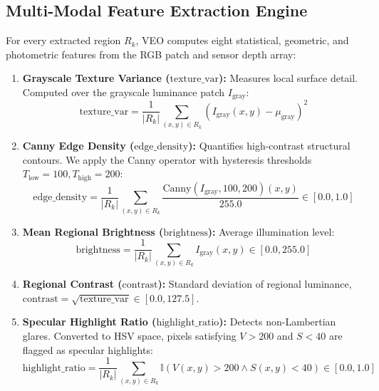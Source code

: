 \documentclass[11pt,a4paper]{article}
\begin{document}
\subsection{Multi-Modal Feature Extraction Engine}
\label{sec:features}
For every extracted region $R_k$, VEO computes eight statistical, geometric, and photometric features from the RGB patch and sensor depth array:

\begin{enumerate}
    \item \textbf{Grayscale Texture Variance ($\text{texture\_var}$):} Measures local surface detail. Computed over the grayscale luminance patch $I_{\mathrm{gray}}$:
    \begin{equation}
    \label{eq:feat_texture}
    \text{texture\_var} = \frac{1}{|R_k|} \sum_{(x,y) \in R_k} \left( I_{\mathrm{gray}}(x,y) - \mu_{\mathrm{gray}} \right)^2
    \end{equation}
    \item \textbf{Canny Edge Density ($\text{edge\_density}$):} Quantifies high-contrast structural contours. We apply the Canny operator with hysteresis thresholds $T_{\mathrm{low}}=100, T_{\mathrm{high}}=200$:
    \begin{equation}
    \label{eq:feat_edge}
    \text{edge\_density} = \frac{1}{|R_k|} \sum_{(x,y) \in R_k} \frac{\text{Canny}(I_{\mathrm{gray}}, 100, 200)(x,y)}{255.0} \in [0.0, 1.0]
    \end{equation}
    \item \textbf{Mean Regional Brightness ($\text{brightness}$):} Average illumination level:
    \begin{equation}
    \label{eq:feat_brightness}
    \text{brightness} = \frac{1}{|R_k|} \sum_{(x,y) \in R_k} I_{\mathrm{gray}}(x,y) \in [0.0, 255.0]
    \end{equation}
    \item \textbf{Regional Contrast ($\text{contrast}$):} Standard deviation of regional luminance, $\text{contrast} = \sqrt{\text{texture\_var}} \in [0.0, 127.5]$.
    \item \textbf{Specular Highlight Ratio ($\text{highlight\_ratio}$):} Detects non-Lambertian glares. Converted to HSV space, pixels satisfying $V > 200$ and $S < 40$ are flagged as specular highlights:
    \begin{equation}
    \label{eq:feat_specular}
    \text{highlight\_ratio} = \frac{1}{|R_k|} \sum_{(x,y) \in R_k} \mathbb{I}\left( V(x,y) > 200 \land S(x,y) < 40 \right) \in [0.0, 1.0]
    \end{equation}

\end{enumerate}
\end{document}
